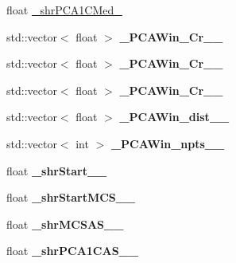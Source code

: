 \begin{DoxyCompactItemize}
\item 
float \hyperlink{classanalysis_1_1MCS_a801eb7a99c0352cfae2a7cdbddbbd09f}{\+\_\+shr\+P\+C\+A1\+C\+Med\+\_\+5cm}
\item 
std\+::vector$<$ float $>$ {\bfseries \+\_\+\+P\+C\+A\+Win\+\_\+Cr\+\_\+\_\+5cm}\hypertarget{classanalysis_1_1MCS_a304dfb22744cf5b7862eb8598647005a}{}\label{classanalysis_1_1MCS_a304dfb22744cf5b7862eb8598647005a}

\item 
std\+::vector$<$ float $>$ {\bfseries \+\_\+\+P\+C\+A\+Win\+\_\+Cr\+\_\+\_\+5cm}\hypertarget{classanalysis_1_1MCS_a7a6def1e1dfa8ab387df40503e7c4b7a}{}\label{classanalysis_1_1MCS_a7a6def1e1dfa8ab387df40503e7c4b7a}

\item 
std\+::vector$<$ float $>$ {\bfseries \+\_\+\+P\+C\+A\+Win\+\_\+Cr\+\_\+\_\+5cm}\hypertarget{classanalysis_1_1MCS_a49754fc1ab640a657a6610aa65cfd624}{}\label{classanalysis_1_1MCS_a49754fc1ab640a657a6610aa65cfd624}

\item 
std\+::vector$<$ float $>$ {\bfseries \+\_\+\+P\+C\+A\+Win\+\_\+dist\+\_\+\_\+5cm}\hypertarget{classanalysis_1_1MCS_af8675679387a9cbb2eb5dc31410bd4f1}{}\label{classanalysis_1_1MCS_af8675679387a9cbb2eb5dc31410bd4f1}

\item 
std\+::vector$<$ int $>$ {\bfseries \+\_\+\+P\+C\+A\+Win\+\_\+npts\+\_\+\_\+5cm}\hypertarget{classanalysis_1_1MCS_ae82b7d48cd2f259474e0448571646e48}{}\label{classanalysis_1_1MCS_ae82b7d48cd2f259474e0448571646e48}

\item 
float {\bfseries \+\_\+shr\+Start\+\_\+\_\+5cm}\hypertarget{classanalysis_1_1MCS_affd35a37811d2d182d721777da425ce8}{}\label{classanalysis_1_1MCS_affd35a37811d2d182d721777da425ce8}

\item 
float {\bfseries \+\_\+shr\+Start\+M\+C\+S\+\_\+\_\+5cm}\hypertarget{classanalysis_1_1MCS_a9bebdf6ea9ac30596f6eb73b749c4b2e}{}\label{classanalysis_1_1MCS_a9bebdf6ea9ac30596f6eb73b749c4b2e}

\item 
float {\bfseries \+\_\+shr\+M\+C\+S\+A\+S\+\_\+\_\+5cm}\hypertarget{classanalysis_1_1MCS_aee124e9ec738e61d2c56a22acc209c06}{}\label{classanalysis_1_1MCS_aee124e9ec738e61d2c56a22acc209c06}

\item 
float {\bfseries \+\_\+shr\+P\+C\+A1\+C\+A\+S\+\_\+\_\+5cm}\hypertarget{classanalysis_1_1MCS_a9ebae1d70ffa46f5510eb7383a3f9d80}{}\label{classanalysis_1_1MCS_a9ebae1d70ffa46f5510eb7383a3f9d80}


\end{DoxyCompactItemize}
